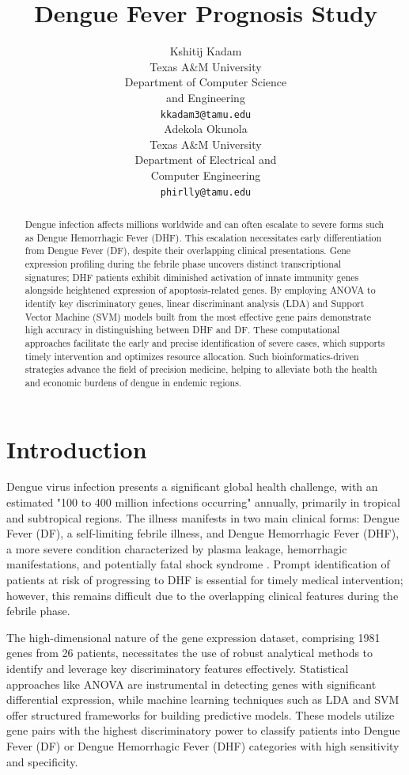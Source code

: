 \documentclass[final]{article}
\title{Dengue Fever Prognosis Study}
\author{
    Kshitij Kadam \\
    Texas A\&M University \\
    Department of Computer Science \\
    and Engineering \\
    \texttt{kkadam3@tamu.edu} \\
    \And
    Adekola Okunola \\
    Texas A\&M University \\
    Department of Electrical and \\
    Computer Engineering \\
    \texttt{phirlly@tamu.edu} \\
}
\begin{document}
\maketitle

\begin{abstract}
Dengue infection affects millions worldwide and can often escalate to severe forms such as Dengue Hemorrhagic Fever (DHF). This escalation necessitates early differentiation from Dengue Fever (DF), despite their overlapping clinical presentations. Gene expression profiling during the febrile phase uncovers distinct transcriptional signatures; DHF patients exhibit diminished activation of innate immunity genes alongside heightened expression of apoptosis-related genes. By employing ANOVA to identify key discriminatory genes, linear discriminant analysis (LDA) and Support Vector Machine (SVM) models built from the most effective gene pairs demonstrate high accuracy in distinguishing between DHF and DF. These computational approaches facilitate the early and precise identification of severe cases, which supports timely intervention and optimizes resource allocation. Such bioinformatics-driven strategies advance the field of precision medicine, helping to alleviate both the health and economic burdens of dengue in endemic regions.
\end{abstract}

\section*{Introduction}
Dengue virus infection presents a significant global health challenge, with an estimated "100 to 400 million infections occurring" \cite{WHO2023} annually, primarily in tropical and subtropical regions. The illness manifests in two main clinical forms: Dengue Fever (DF), a self-limiting febrile illness, and Dengue Hemorrhagic Fever (DHF), a more severe condition characterized by plasma leakage, hemorrhagic manifestations, and potentially fatal shock syndrome \cite{Nascimento2009}. Prompt identification of patients at risk of progressing to DHF is essential for timely medical intervention; however, this remains difficult due to the overlapping clinical features during the febrile phase.

The high-dimensional nature of the gene expression dataset, comprising 1981 genes from 26 patients, necessitates the use of robust analytical methods to identify and leverage key discriminatory features effectively. Statistical approaches like ANOVA are instrumental in detecting genes with significant differential expression, while machine learning techniques such as LDA and SVM offer structured frameworks for building predictive models. These models utilize gene pairs with the highest discriminatory power to classify patients into Dengue Fever (DF) or Dengue Hemorrhagic Fever (DHF) categories with high sensitivity and specificity.
\end{document}
